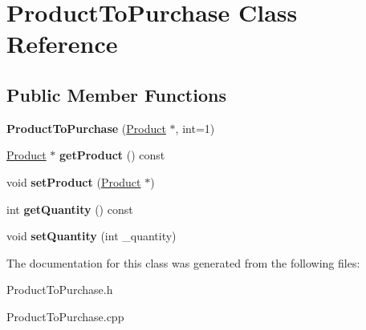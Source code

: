 \hypertarget{classProductToPurchase}{}\section{Product\+To\+Purchase Class Reference}
\label{classProductToPurchase}
\subsection*{Public Member Functions}
\begin{DoxyCompactItemize}
\item 
\mbox{\label{classProductToPurchase_a65d9a7db4ea2986621bb4cf7fa9dd35f}} 
{\bfseries Product\+To\+Purchase} (\hyperlink{classProduct}{Product} $\ast$, int=1)
\item 
\mbox{\label{classProductToPurchase_a6eaebabfae95c423101ff08ac45d5a80}} 
\hyperlink{classProduct}{Product} $\ast$ {\bfseries get\+Product} () const
\item 
\mbox{\label{classProductToPurchase_abb61c6a0bf69664e220c2db208085267}} 
void {\bfseries set\+Product} (\hyperlink{classProduct}{Product} $\ast$)
\item 
\mbox{\label{classProductToPurchase_a014993f945537561c6161914e9f981d4}} 
int {\bfseries get\+Quantity} () const
\item 
\mbox{\label{classProductToPurchase_aa7dd27c6260de99906366f0a89a73439}} 
void {\bfseries set\+Quantity} (int \+\_\+quantity)
\end{DoxyCompactItemize}


The documentation for this class was generated from the following files\+:\begin{DoxyCompactItemize}
\item 
Product\+To\+Purchase.\+h\item 
Product\+To\+Purchase.\+cpp\end{DoxyCompactItemize}
